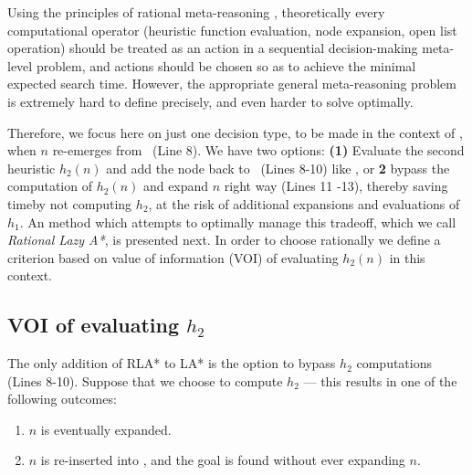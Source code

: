 

Using the principles of rational meta-reasoning \cite{RussellWefald},
theoretically every computational operator (heuristic function evaluation, node
expansion, open list operation) should be treated as an action in a sequential
decision-making meta-level problem, and actions should be chosen so as to
achieve the minimal expected search time. However, the appropriate
general meta-reasoning problem is extremely hard to define precisely, and even harder
to solve optimally.

Therefore, we focus here on just one decision type, to be
made in the context of \lazyastar, when $n$ re-emerges from \OPEN~(Line 8).
We have two options: {\bf (1)}  Evaluate the second heuristic $h_2(n)$ and add
the node back to \OPEN~(Lines 8-10) like \lazyastar, or {\bf 2} bypass the
computation of $h_2(n)$ and expand $n$ right way (Lines 11 -13), thereby
saving timeby not computing $h_2$, at the risk of additional expansions and evaluations of $h_1$.
An method which attempts to
optimally manage this tradeoff, which we call \textit{Rational Lazy A*}, is presented next.
In order to choose rationally we define a criterion based on value of
information (VOI) of evaluating $h_2(n)$ in this context.

\subsection{VOI of evaluating $h_2$}

The only addition of RLA* to LA* is the option to bypass $h_2$ computations (Lines 8-10).
Suppose that we choose to compute $h_2$ --- this results in one of the
following outcomes:
\begin{enumerate}
\item $n$ is eventually expanded.
\item $n$ is re-inserted into \OPEN, and the goal is found without ever expanding $n$.
\end{enumerate}

